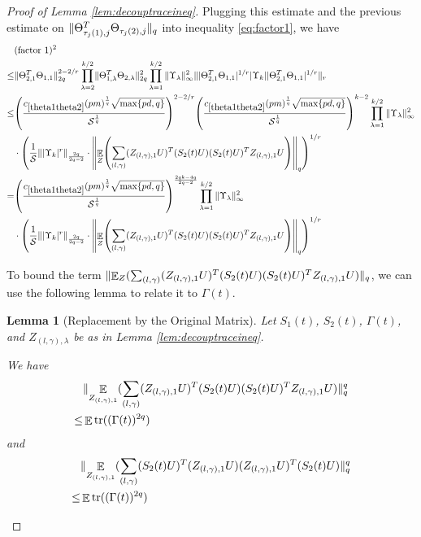 \documentclass[11pt]{amsart}
\numberwithin{equation}{section}
\numberwithin{equation}{section}
\DeclareMathOperator{\E}{\mathbb{E}}
\DeclareMathOperator*{\tr}{tr}
\newcommand{\cS}{\mathcal{S}}
\DeclarePairedDelimiter{\norm}{\lVert}{\rVert}
\DeclarePairedDelimiter{\paren}{(}{)}
\newtheorem{lemma}[theorem]{Lemma}
\theoremstyle{remark}
\theoremstyle{definition}
\begin{document}
\begin{proof}[Proof of Lemma \ref{lem:decouptraceineq}]
Plugging this estimate and the previous estimate on $\norm{\Theta_{\tau_j(1),j}^T\Theta_{\tau_j(2),j}}_{q}$ into inequality \ref{eq:factor1}, we have
\begin{equation}\label{eq:factor1, second}
\begin{aligned}
&(\text{factor 1})^2\\ 
\le & \norm{\Theta_{2,1}^T\Theta_{1,1}}_{2q}^{2-2/r} \prod\limits_{\lambda  = 2}^{k/2}\norm{\Theta_{1,\lambda}^T\Theta_{2,\lambda}}_{2q}^2\prod\limits_{\lambda  = 1}^{k/2} {\norm{\Upsilon_\lambda }_{\infty}^2} \norm{|\Theta_{2,1}^T\Theta_{1,1}|^{1/r} |\Upsilon_k| |\Theta_{2,1}^T\Theta_{1,1}|^{1/r}}_r
 \\ \le & \paren*{\frac{c_{\ref*{theta1theta2}}(pm)^{\frac{1}{q}}\sqrt{\max \{ pd, q \}}}{\cS^\frac{1}{q}}}^{2-2/r}\paren*{\frac{c_{\ref*{theta1theta2}}(pm)^{\frac{1}{q}}\sqrt{\max \{ pd, q \}}}{\cS^\frac{1}{q}}}^{k-2} \prod\limits_{\lambda  = 1}^{k/2} {\norm{\Upsilon_\lambda }_{\infty}^2} \\ &\cdot \paren*{\frac{1}{\cS} \norm{|\Upsilon_k|^{r}}_{\frac{2q}{2q-2}} \cdot \norm*{\E_{Z}\paren*{\sum_{(l,\gamma)}(Z_{(l,\gamma),1}U)^T(S_2(t)U)(S_2(t)U )^TZ_{(l,\gamma),1}U} }_{q}}^{1/r}
\\=&\paren*{\frac{c_{\ref*{theta1theta2}}(pm)^{\frac{1}{q}}\sqrt{\max \{ pd, q \}}}{\cS^\frac{1}{q}}}^{\frac{2qk-4q}{2q-2}}\prod\limits_{\lambda  = 1}^{k/2} {\norm{\Upsilon_\lambda }_{\infty}^2} \\ &\cdot \paren*{\frac{1}{\cS} \norm{|\Upsilon_k|^{r}}_{\frac{2q}{2q-2}} \cdot \norm*{\E_{Z}\paren*{\sum_{(l,\gamma)}(Z_{(l,\gamma),1}U)^T(S_2(t)U)(S_2(t)U )^TZ_{(l,\gamma),1}U} }_{q}}^{1/r}
\end{aligned}
\end{equation}

To bound the term $\norm{\E_{Z}(\sum_{(l,\gamma)}(Z_{(l,\gamma),1}U)^T(S_2(t)U)(S_2(t)U )^TZ_{(l,\gamma),1}U)}_{q}$, we can use the following lemma to relate it to $\Gamma(t)$.

\begin{lemma}[Replacement by the Original Matrix] \label{zssz}
Let $S_1(t)$, $S_2(t)$, $\Gamma(t)$, and $Z_{(l,\gamma),\lambda}$  be as in Lemma \ref{lem:decouptraceineq}.

We have
\begin{align*}
    &\norm{\E_{Z_{(l,\gamma),1}}(\sum_{(l,\gamma)}(Z_{(l,\gamma),1}U)^T(S_2(t)U)(S_2(t)U )^TZ_{(l,\gamma),1}U)}_{q}^q
    \\ \le & \E \tr((\Gamma(t))^{2q})
\end{align*}
and
\begin{align*}
    &\norm{\E_{Z_{(l,\gamma),1}}(\sum_{(l,\gamma)}(S_2(t)U)^T(Z_{(l,\gamma),1}U)(Z_{(l,\gamma),1}U)^T(S_2(t)U )}_{q}^q
    \\ \le & \E \tr((\Gamma(t))^{2q})
\end{align*}
\end{lemma}


\end{proof}
\end{document}
